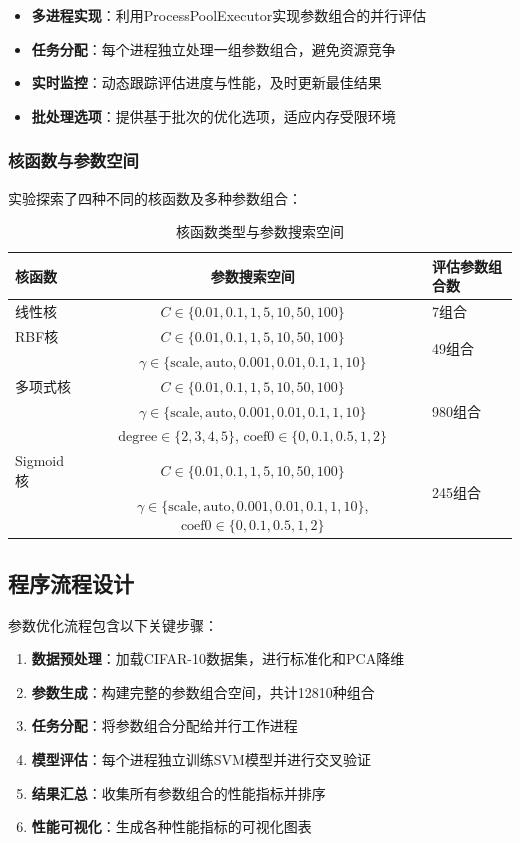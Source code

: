 \documentclass[UTF8]{report}
\theoremstyle{MyLineTheoremStyle} %
\theoremstyle{MyBlockTheoremStyle} %
\theoremstyle{MySubsubsectionStyle} %
\begin{document}
\begin{itemize}
    \item \textbf{多进程实现}：利用ProcessPoolExecutor实现参数组合的并行评估
    \item \textbf{任务分配}：每个进程独立处理一组参数组合，避免资源竞争
    \item \textbf{实时监控}：动态跟踪评估进度与性能，及时更新最佳结果
    \item \textbf{批处理选项}：提供基于批次的优化选项，适应内存受限环境
\end{itemize}

\subsubsection{核函数与参数空间}
实验探索了四种不同的核函数及多种参数组合：

\begin{table}[h]
\centering
\caption{核函数类型与参数搜索空间}
\begin{tabular}{l c l}
\toprule
\textbf{核函数} & \textbf{参数搜索空间} & \textbf{评估参数组合数} \\
\midrule
线性核 & $C \in \{0.01, 0.1, 1, 5, 10, 50, 100\}$ & 7组合 \\
RBF核 & $C \in \{0.01, 0.1, 1, 5, 10, 50, 100\}$ & \multirow{2}{*}{49组合} \\
 & $\gamma \in \{\text{scale}, \text{auto}, 0.001, 0.01, 0.1, 1, 10\}$ & \\
多项式核 & $C \in \{0.01, 0.1, 1, 5, 10, 50, 100\}$ & \multirow{3}{*}{980组合} \\
 & $\gamma \in \{\text{scale}, \text{auto}, 0.001, 0.01, 0.1, 1, 10\}$ & \\
 & $\text{degree} \in \{2, 3, 4, 5\}$, $\text{coef0} \in \{0, 0.1, 0.5, 1, 2\}$ & \\
Sigmoid核 & $C \in \{0.01, 0.1, 1, 5, 10, 50, 100\}$ & \multirow{2}{*}{245组合} \\
 & $\gamma \in \{\text{scale}, \text{auto}, 0.001, 0.01, 0.1, 1, 10\}$, $\text{coef0} \in \{0, 0.1, 0.5, 1, 2\}$ & \\
\bottomrule
\end{tabular}
\end{table}
\subsection{程序流程设计}
参数优化流程包含以下关键步骤：

\begin{enumerate}[label=\arabic*.]
    \item \textbf{数据预处理}：加载CIFAR-10数据集，进行标准化和PCA降维
    \item \textbf{参数生成}：构建完整的参数组合空间，共计12810种组合
    \item \textbf{任务分配}：将参数组合分配给并行工作进程
    \item \textbf{模型评估}：每个进程独立训练SVM模型并进行交叉验证
    \item \textbf{结果汇总}：收集所有参数组合的性能指标并排序
    \item \textbf{性能可视化}：生成各种性能指标的可视化图表
\end{enumerate}
\end{document}

